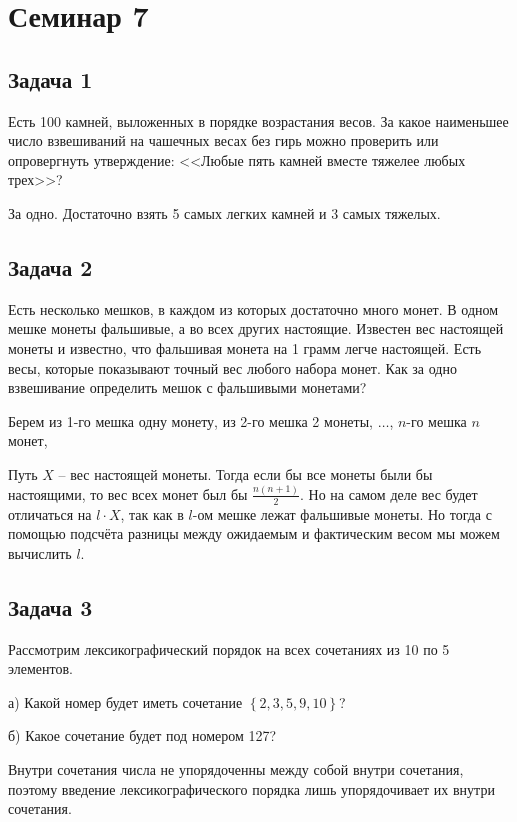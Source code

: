 
\section{Семинар 7}

\subsection{Задача 1}

Есть 100 камней, выложенных в порядке возрастания весов. За какое наименьшее
число взвешиваний на чашечных весах без гирь можно проверить или опровергнуть
утверждение: <<Любые пять камней вместе тяжелее любых трех>>?

За одно. Достаточно взять 5 самых легких камней и 3 самых тяжелых.

\subsection{Задача 2}

Есть несколько мешков, в каждом из которых достаточно много монет. В одном мешке монеты фальшивые, а во всех других настоящие. Известен вес настоящей монеты
и известно, что фальшивая монета на 1 грамм легче настоящей. Есть весы, которые
показывают точный вес любого набора монет. Как за одно взвешивание определить
мешок с фальшивыми монетами?

Берем из 1-го мешка одну монету, из 2-го мешка 2 монеты, $\ldots$, $n$-го мешка $n$ монет,

Путь $X$ -- вес настоящей монеты. Тогда если бы все монеты были бы настоящими, то вес всех монет был бы $\displaystyle \frac{n(n+1)}{2}$. Но на самом деле вес будет отличаться на $l \cdot X$, так как в $l$-ом мешке лежат фальшивые монеты. Но тогда с помощью подсчёта разницы между ожидаемым и фактическим весом мы можем вычислить $l$.

\subsection{Задача 3}

Рассмотрим лексикографический порядок на всех сочетаниях из 10 по 5 элементов.

а) Какой номер будет иметь сочетание $\left\{2,3,5,9,10\right\}$?

б) Какое сочетание будет под номером 127?

Внутри сочетания числа не упорядоченны между собой внутри сочетания, поэтому введение лексикографического порядка лишь упорядочивает их внутри сочетания.

